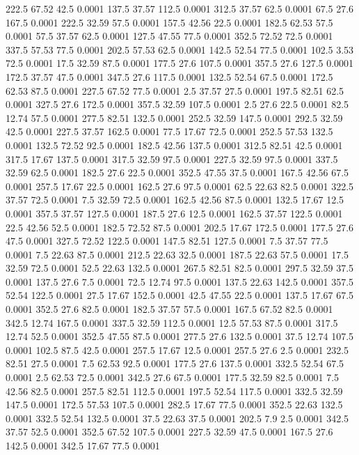 222.5	67.52	42.5	0.0001
137.5	37.57	112.5	0.0001
312.5	37.57	62.5	0.0001
67.5	27.6	167.5	0.0001
222.5	32.59	57.5	0.0001
157.5	42.56	22.5	0.0001
182.5	62.53	57.5	0.0001
57.5	37.57	62.5	0.0001
127.5	47.55	77.5	0.0001
352.5	72.52	72.5	0.0001
337.5	57.53	77.5	0.0001
202.5	57.53	62.5	0.0001
142.5	52.54	77.5	0.0001
102.5	3.53	72.5	0.0001
17.5	32.59	87.5	0.0001
177.5	27.6	107.5	0.0001
357.5	27.6	127.5	0.0001
172.5	37.57	47.5	0.0001
347.5	27.6	117.5	0.0001
132.5	52.54	67.5	0.0001
172.5	62.53	87.5	0.0001
227.5	67.52	77.5	0.0001
2.5	37.57	27.5	0.0001
197.5	82.51	62.5	0.0001
327.5	27.6	172.5	0.0001
357.5	32.59	107.5	0.0001
2.5	27.6	22.5	0.0001
82.5	12.74	57.5	0.0001
277.5	82.51	132.5	0.0001
252.5	32.59	147.5	0.0001
292.5	32.59	42.5	0.0001
227.5	37.57	162.5	0.0001
77.5	17.67	72.5	0.0001
252.5	57.53	132.5	0.0001
132.5	72.52	92.5	0.0001
182.5	42.56	137.5	0.0001
312.5	82.51	42.5	0.0001
317.5	17.67	137.5	0.0001
317.5	32.59	97.5	0.0001
227.5	32.59	97.5	0.0001
337.5	32.59	62.5	0.0001
182.5	27.6	22.5	0.0001
352.5	47.55	37.5	0.0001
167.5	42.56	67.5	0.0001
257.5	17.67	22.5	0.0001
162.5	27.6	97.5	0.0001
62.5	22.63	82.5	0.0001
322.5	37.57	72.5	0.0001
7.5	32.59	72.5	0.0001
162.5	42.56	87.5	0.0001
132.5	17.67	12.5	0.0001
357.5	37.57	127.5	0.0001
187.5	27.6	12.5	0.0001
162.5	37.57	122.5	0.0001
22.5	42.56	52.5	0.0001
182.5	72.52	87.5	0.0001
202.5	17.67	172.5	0.0001
177.5	27.6	47.5	0.0001
327.5	72.52	122.5	0.0001
147.5	82.51	127.5	0.0001
7.5	37.57	77.5	0.0001
7.5	22.63	87.5	0.0001
212.5	22.63	32.5	0.0001
187.5	22.63	57.5	0.0001
17.5	32.59	72.5	0.0001
52.5	22.63	132.5	0.0001
267.5	82.51	82.5	0.0001
297.5	32.59	37.5	0.0001
137.5	27.6	7.5	0.0001
72.5	12.74	97.5	0.0001
137.5	22.63	142.5	0.0001
357.5	52.54	122.5	0.0001
27.5	17.67	152.5	0.0001
42.5	47.55	22.5	0.0001
137.5	17.67	67.5	0.0001
352.5	27.6	82.5	0.0001
182.5	37.57	57.5	0.0001
167.5	67.52	82.5	0.0001
342.5	12.74	167.5	0.0001
337.5	32.59	112.5	0.0001
12.5	57.53	87.5	0.0001
317.5	12.74	52.5	0.0001
352.5	47.55	87.5	0.0001
277.5	27.6	132.5	0.0001
37.5	12.74	107.5	0.0001
102.5	87.5	42.5	0.0001
257.5	17.67	12.5	0.0001
257.5	27.6	2.5	0.0001
232.5	82.51	27.5	0.0001
7.5	62.53	92.5	0.0001
177.5	27.6	137.5	0.0001
332.5	52.54	67.5	0.0001
2.5	62.53	72.5	0.0001
342.5	27.6	67.5	0.0001
177.5	32.59	82.5	0.0001
7.5	42.56	82.5	0.0001
257.5	82.51	112.5	0.0001
197.5	52.54	117.5	0.0001
332.5	32.59	147.5	0.0001
172.5	57.53	107.5	0.0001
282.5	17.67	77.5	0.0001
352.5	22.63	132.5	0.0001
332.5	52.54	132.5	0.0001
37.5	22.63	37.5	0.0001
202.5	7.9	2.5	0.0001
342.5	37.57	52.5	0.0001
352.5	67.52	107.5	0.0001
227.5	32.59	47.5	0.0001
167.5	27.6	142.5	0.0001
342.5	17.67	77.5	0.0001
